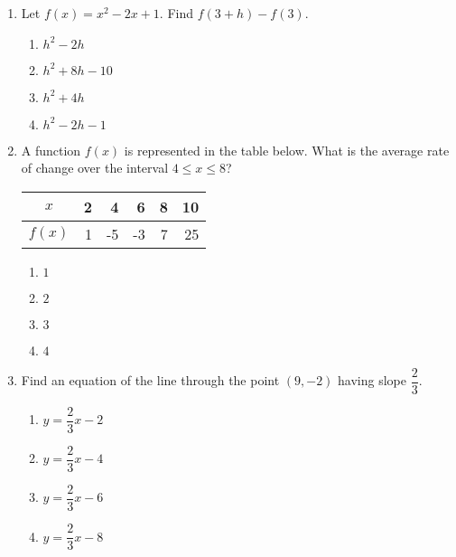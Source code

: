 \documentclass{article}
\begin{document}
\begin{enumerate}



\item Let $f(x)=x^2-2x+1$. Find $f(3+h)-f(3)$.

  \begin{enumerate}
  
  \item $h^2-2h$ %
   \item $h^2+8h-10$ %
   \item $h^2+4h$ %
   \item $h^2-2h-1$ %
  \end{enumerate}


\item A function $f(x)$ is represented in the table below. What is the average rate of change over the interval $4 \leq x \leq 8$?

\begin{center}
\begin{tabular}{c|rrrrr}
$x$ & 2 & 4 & 6 & 8 & 10 \\ \hline
$f(x)$ & 1 & -5 & -3 & 7 & 25 \\
\end{tabular}

\end{center}

 
  \begin{enumerate}
  \item $1$
  \item $2$
  \item $3$ %
  \item $4$
 
  \end{enumerate}
 
  

\item Find an equation of the line through the point $(9,-2)$ having slope $\dfrac{2}{3}$. 

  \begin{enumerate}
  \item $y=\dfrac{2}{3}x-2$ %
  \item $y=\dfrac{2}{3}x-4$
  \item $y=\dfrac{2}{3}x-6$
  \item $y=\dfrac{2}{3}x-8$ %
  \end{enumerate}


\end{enumerate}
\end{document}
